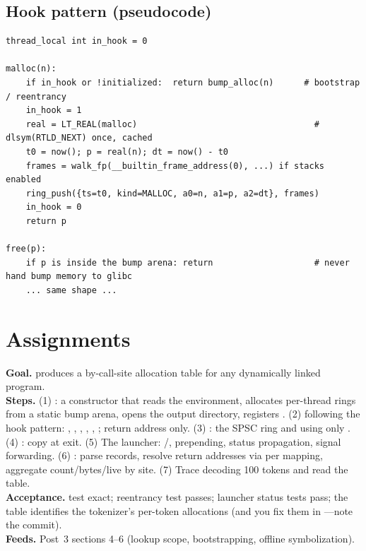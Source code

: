 \subsection{Hook pattern (pseudocode)}

\begin{lstlisting}[style=plain]
thread_local int in_hook = 0

malloc(n):
    if in_hook or !initialized:  return bump_alloc(n)      # bootstrap / reentrancy
    in_hook = 1
    real = LT_REAL(malloc)                                   # dlsym(RTLD_NEXT) once, cached
    t0 = now(); p = real(n); dt = now() - t0
    frames = walk_fp(__builtin_frame_address(0), ...) if stacks enabled
    ring_push({ts=t0, kind=MALLOC, a0=n, a1=p, a2=dt}, frames)
    in_hook = 0
    return p

free(p):
    if p is inside the bump arena: return                    # never hand bump memory to glibc
    ... same shape ...
\end{lstlisting}

\section{Assignments}

\textbf{Goal.}  produces a by-call-site allocation table for any dynamically linked program.\\
\textbf{Steps.} (1) : a constructor that reads the environment, allocates per-thread rings from a static bump arena, opens the output directory, registers . (2)  following the hook pattern: , , , , , ; return address only. (3) : the SPSC ring and  using only . (4) : copy  at exit. (5) The launcher: /,  prepending, status propagation, signal forwarding. (6) : parse records, resolve return addresses via  per mapping, aggregate count/bytes/live by site. (7) Trace  decoding 100 tokens and read the table.\\
\textbf{Acceptance.}  test exact; reentrancy test passes; launcher status tests pass; the  table identifies the tokenizer's per-token allocations (and you fix them in ---note the commit).\\
\textbf{Feeds.} Post~3 sections 4--6 (lookup scope, bootstrapping, offline symbolization).

